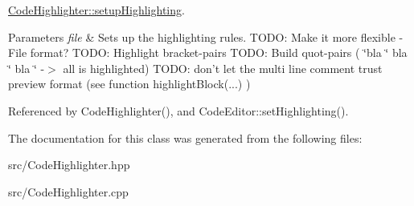 \hyperlink{classCodeHighlighter_a61d21b1d88b955403a5d1e3601a22353}{Code\+Highlighter\+::setup\+Highlighting}. 


\begin{DoxyParams}{Parameters}
{\em file} & Sets up the highlighting rules. T\+O\+D\+O\+: Make it more flexible -\/ File format? T\+O\+D\+O\+: Highlight bracket-\/pairs T\+O\+D\+O\+: Build quot-\/pairs ( \char`\"{}bla \char`\"{} bla \char`\"{} bla \char`\"{} -\/$>$ all is highlighted) T\+O\+D\+O\+: don't let the multi line comment trust preview format (see function highlight\+Block(...) ) \\
\hline
\end{DoxyParams}


Referenced by Code\+Highlighter(), and Code\+Editor\+::set\+Highlighting().



The documentation for this class was generated from the following files\+:\begin{DoxyCompactItemize}
\item 
src/Code\+Highlighter.\+hpp\item 
src/Code\+Highlighter.\+cpp\end{DoxyCompactItemize}
